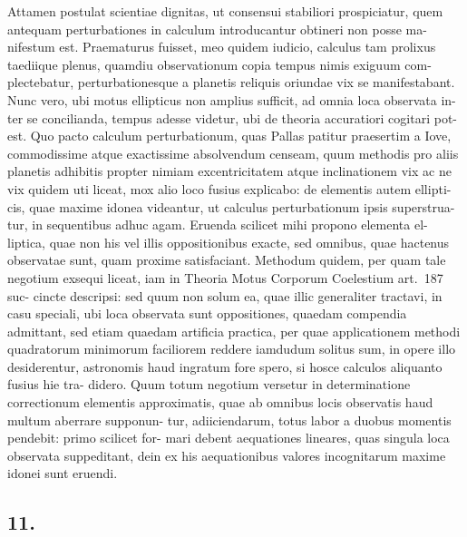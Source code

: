 \documentclass[12pt,a4paper]{article}
\begin{document}
Attamen postulat scientiae dignitas, ut consensui stabiliori prospiciatur,
quem antequam perturbationes in calculum introducantur obtineri non posse ma-
nifestum est. Praematurus fuisset, meo quidem iudicio, calculus tam prolixus
taediique plenus, quamdiu observationum copia tempus nimis exiguum com-
plectebatur, perturbationesque a planetis reliquis oriundae vix se manifestabant.
Nunc vero, ubi motus ellipticus non amplius sufficit, ad omnia loca observata in-
ter se concilianda, tempus adesse videtur, ubi de theoria accuratiori cogitari pot-
est. Quo pacto calculum perturbationum, quas Pallas patitur praesertim a Iove,
commodissime atque exactissime absolvendum censeam, quum methodis pro aliis
planetis adhibitis propter nimiam excentricitatem atque inclinationem vix ac ne
vix quidem uti liceat, mox alio loco fusius explicabo: de elementis autem ellipti-
cis, quae maxime idonea videantur, ut calculus perturbationum ipsis superstrua-
tur, in sequentibus adhuc agam. Eruenda scilicet mihi propono elementa el-
liptica, quae non his vel illis oppositionibus exacte, sed omnibus, quae hactenus
observatae sunt, quam proxime satisfaciant. Methodum quidem, per quam tale
negotium exsequi liceat, iam in Theoria Motus Corporum Coelestium art.\ 187 suc-
cincte descripsi: sed quum non solum ea, quae illic generaliter tractavi, in casu
speciali, ubi loca observata sunt oppositiones, quaedam compendia admittant, sed
etiam quaedam artificia practica, per quae applicationem methodi quadratorum
minimorum faciliorem reddere iamdudum solitus sum, in opere illo desiderentur,
astronomis haud ingratum fore spero, si hosce calculos aliquanto fusius hie tra-
didero. Quum totum negotium versetur in determinatione correctionum elementis
approximatis, quae ab omnibus locis observatis haud multum aberrare supponun-
tur, adiiciendarum, totus labor a duobus momentis pendebit: primo scilicet for-
mari debent aequationes lineares, quas singula loca observata suppeditant, dein
ex his aequationibus valores incognitarum maxime idonei sunt eruendi.

\subsection*{11.}
\end{document}

